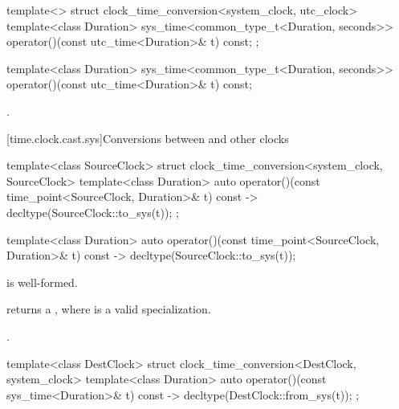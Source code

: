 \begin{codeblock}
template<>
struct clock_time_conversion<system_clock, utc_clock> {
  template<class Duration>
    sys_time<common_type_t<Duration, seconds>>
      operator()(const utc_time<Duration>& t) const;
};
\end{codeblock}

%
\begin{itemdecl}
template<class Duration>
  sys_time<common_type_t<Duration, seconds>>
    operator()(const utc_time<Duration>& t) const;
\end{itemdecl}

\begin{itemdescr}
\pnum
\returns
{}.
\end{itemdescr}

[time.clock.cast.sys]{Conversions between  and other clocks}

\begin{codeblock}
template<class SourceClock>
struct clock_time_conversion<system_clock, SourceClock> {
  template<class Duration>
    auto operator()(const time_point<SourceClock, Duration>& t) const
      -> decltype(SourceClock::to_sys(t));
};
\end{codeblock}

%
\begin{itemdecl}
template<class Duration>
  auto operator()(const time_point<SourceClock, Duration>& t) const
    -> decltype(SourceClock::to_sys(t));
\end{itemdecl}

\begin{itemdescr}
\pnum
\constraints
{} is well-formed.

\pnum
\mandates
{} returns a ,
where  is a valid  specialization.

\pnum
\returns
{}.
\end{itemdescr}

\begin{codeblock}
template<class DestClock>
struct clock_time_conversion<DestClock, system_clock> {
  template<class Duration>
    auto operator()(const sys_time<Duration>& t) const
      -> decltype(DestClock::from_sys(t));
};
\end{codeblock}


